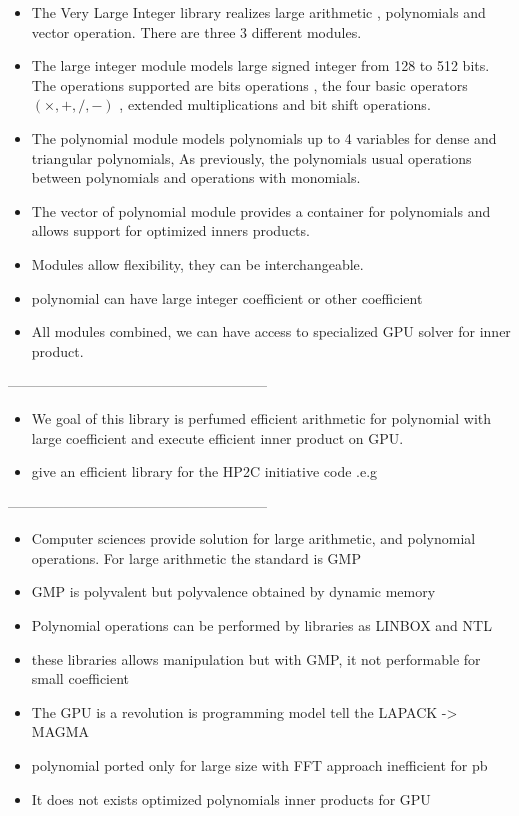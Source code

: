 \documentclass[oribibl]{llncs2e/llncs}
\begin{document}
\begin{itemize}
\item The Very Large Integer library realizes large arithmetic , polynomials  and vector operation.  There are three 3 different modules. 
\item The large integer module models large signed integer from 128 to 512 bits. The operations supported are bits operations , the four basic operators $(\times,+,/,-)$ , extended multiplications and bit shift operations. 
\item The polynomial module models polynomials up to 4 variables for dense and triangular polynomials, As previously, the polynomials usual  operations between polynomials and operations with monomials.  
\item The vector of polynomial module provides a container for polynomials and allows support for optimized inners products.
\item Modules allow flexibility, they can be interchangeable. 
\item polynomial can have large integer coefficient or other coefficient 
\item All modules combined, we can have access to specialized GPU solver for inner product.
\end{itemize}
--------------------------------------------------------
\begin{itemize}
\item  We goal of this library is perfumed efficient arithmetic for polynomial with large coefficient and execute efficient inner product on GPU.
\item give an efficient library for the HP2C initiative code .e.g 
\end{itemize}
--------------------------------------------------------
\begin{itemize}

\item Computer sciences provide solution for large arithmetic, and polynomial operations. For large arithmetic the standard is GMP
\item  GMP is polyvalent but polyvalence obtained by dynamic memory 
\item Polynomial operations can be performed by libraries as LINBOX and NTL
\item these libraries allows manipulation but with GMP, it not performable for small coefficient
\item  The GPU is a revolution is programming model tell the LAPACK -> MAGMA 
\item polynomial ported only for large size with FFT approach inefficient for pb 
\item It does not exists optimized polynomials inner products for GPU
\end{itemize}
\end{document}
